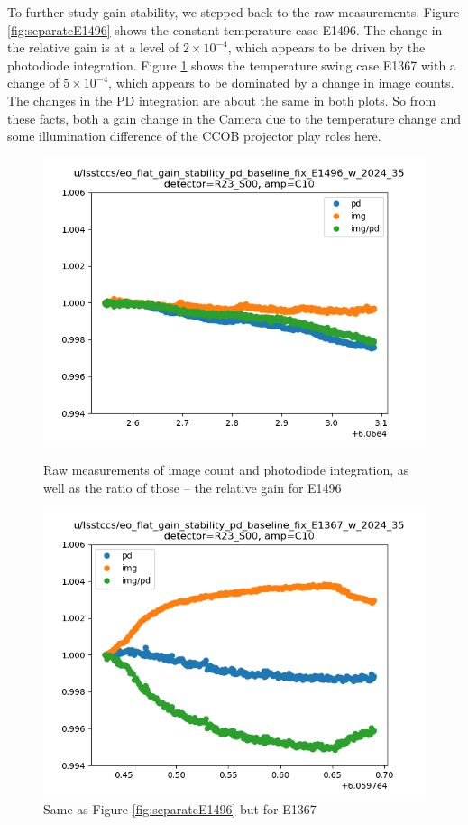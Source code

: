 To further study gain stability, we stepped back to the raw measurements. Figure \ref{fig:separateE1496} shows the constant temperature case E1496. The change in the relative gain is at a level of $2\times 10^{-4}$, which appears to be driven by the photodiode integration.
Figure \ref{fig:separateE1367} shows the temperature swing case E1367 with a change of $5\times10^{-4}$, which appears to be dominated by a change in image counts. The changes in the PD integration are about the same in both plots. So from these facts, both a gain change in the Camera due to the temperature change and some illumination difference of the CCOB projector play roles here.
\begin{figure}[htbp]
\centering
\begin{minipage}{0.45\textwidth}
    \centering
    \includegraphics[width=\textwidth]{figures/gaintemp/E1496separate.png}
    \caption{Raw measurements of image count and photodiode integration, as well as the ratio of those -- the relative gain for E1496}
    \label{fig:separateE1496}
\end{minipage}
\hfill
\begin{minipage}{0.45\textwidth}
    \centering
    \includegraphics[width=\textwidth]{figures/gaintemp/E1367separate.png}
    \caption{Same as Figure \ref{fig:separateE1496} but for E1367}
    \label{fig:separateE1367}
\end{minipage}
\end{figure}


